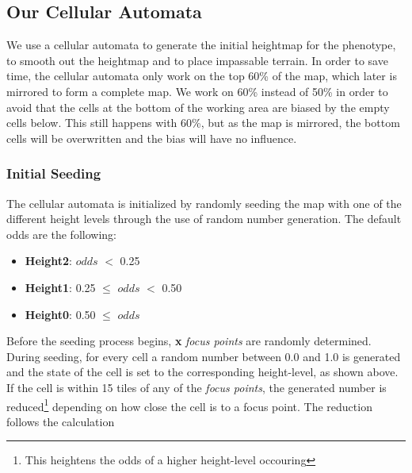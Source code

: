 
\subsection{Our Cellular Automata}
\label{methodology_ca_our}

We use a cellular automata to generate the initial heightmap for the phenotype, to smooth out the heightmap and to place impassable terrain. In order to save time, the cellular automata only work on the top 60\% of the map, which later is mirrored to form a complete map. We work on 60\% instead of 50\% in order to avoid that the cells at the bottom of the working area are biased by the empty cells below. This still happens with 60\%, but as the map is mirrored, the bottom cells will be overwritten and the bias will have no influence.

\subsubsection{Initial Seeding}
\label{methodology_ca_our_initial}

The cellular automata is initialized by randomly seeding the map with one of the different height levels through the use of random number generation. The default odds are the following:

\begin{itemize}

	\item \textbf{Height2}: $odds$ $<$ 0.25

	\item \textbf{Height1}: 0.25 $\le$ $odds$ $<$ 0.50

	\item \textbf{Height0}: 0.50 $\le$ $odds$

\end{itemize}

Before the seeding process begins, \textbf{x} \textit{focus points} are randomly determined. During seeding, for every cell a random number between 0.0 and 1.0 is generated and the state of the cell is set to the corresponding height-level, as shown above. If the cell is within 15 tiles of any of the \textit{focus points}, the generated number is reduced\footnote{This heightens the odds of a higher height-level occouring} depending on how close the cell is to a focus point. The reduction follows the calculation

